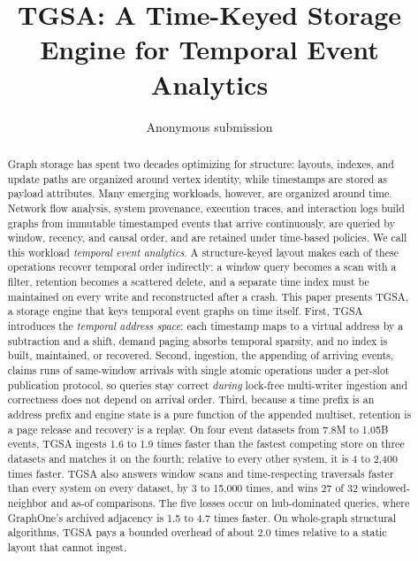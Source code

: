 \documentclass[sigconf,nonacm]{acmart}
\newcommand{\sys}{TGSA\xspace}
\newcommand{\nLanlEvents}{1.05B}
\newcommand{\nSmallEvents}{7.8M}
\newcommand{\nIngestGapLo}{1.6}     %
\newcommand{\nIngestGapHi}{1.9}
\newcommand{\nIngestRestLo}{4}      %
\newcommand{\nIngestRestHi}{2{,}400}
\newcommand{\nStructuralGap}{2.0}   %
\begin{document}
\title{TGSA: A Time-Keyed Storage Engine for Temporal Event Analytics}

\author{Anonymous submission}
\affiliation{\institution{}\city{}\country{}}

\begin{abstract}
Graph storage has spent two decades optimizing for structure: layouts, indexes, and update paths are organized around vertex identity, while timestamps are stored as payload attributes. Many emerging workloads, however, are organized around time. Network flow analysis, system provenance, execution traces, and interaction logs build graphs from immutable timestamped events that arrive continuously, are queried by window, recency, and causal order, and are retained under time-based policies. We call this workload \emph{temporal event analytics}. A structure-keyed layout makes each of these operations recover temporal order indirectly: a window query becomes a scan with a filter, retention becomes a scattered delete, and a separate time index must be maintained on every write and reconstructed after a crash. This paper presents \sys, a storage engine that keys temporal event graphs on time itself. First, \sys introduces the \emph{temporal address space}: each timestamp maps to a virtual address by a subtraction and a shift, demand paging absorbs temporal sparsity, and no index is built, maintained, or recovered. Second, ingestion, the appending of arriving events, claims runs of same-window arrivals with single atomic operations under a per-slot publication protocol, so queries stay correct \emph{during} lock-free multi-writer ingestion and correctness does not depend on arrival order. Third, because a time prefix is an address prefix and engine state is a pure function of the appended multiset, retention is a page release and recovery is a replay. On four event datasets from \nSmallEvents{} to \nLanlEvents{} events, \sys ingests \nIngestGapLo{} to \nIngestGapHi{} times faster than the fastest competing store on three datasets and matches it on the fourth; relative to every other system, it is \nIngestRestLo{} to \nIngestRestHi{} times faster. \sys also answers window scans and time-respecting traversals faster than every system on every dataset, by 3 to 15{,}000 times, and wins 27 of 32 windowed-neighbor and as-of comparisons. The five losses occur on hub-dominated queries, where GraphOne's archived adjacency is 1.5 to 4.7 times faster. On whole-graph structural algorithms, \sys pays a bounded overhead of about \nStructuralGap{} times relative to a static layout that cannot ingest.
\end{abstract}
\end{document}
